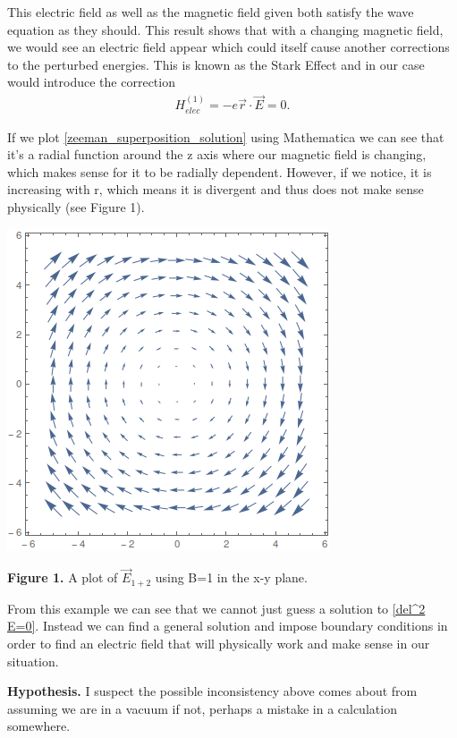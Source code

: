 This electric field as well as the magnetic field given both satisfy the wave equation as they should. This result shows that with a changing magnetic field, we would see an electric field appear which could itself cause another corrections to the perturbed energies. This is known as the Stark Effect and in our case would introduce the correction
\begin{align}
	H_{elec}^{(1)}=-e\vec{r}\cdot\vec{E}=0.
\end{align} 

If we plot \ref{zeeman_superposition_solution} using Mathematica we can see that it's a radial function around the z axis where our magnetic field is changing, which makes sense for it to be radially dependent. However, if we notice, it is increasing with r, which means it is divergent and thus does not make sense physically (see Figure 1).

\begin{center}
	\includegraphics[]{./chapters/electromagnetism/images/E1plus2.png}
	
	{\footnotesize \textbf{Figure 1.} A plot of $\vec{E}_{1+2}$ using B=1 in the x-y plane.}
\end{center}

From this example we can see that we cannot just guess a solution to \ref{del^2 E=0}. Instead we can find a general solution and impose boundary conditions in order to find an electric field that will physically work and make sense in our situation.

\begin{center}
	\textbf{Hypothesis.} I suspect the possible inconsistency above comes about from assuming we are in a vacuum if not, perhaps a mistake in a calculation somewhere. 
\end{center}





